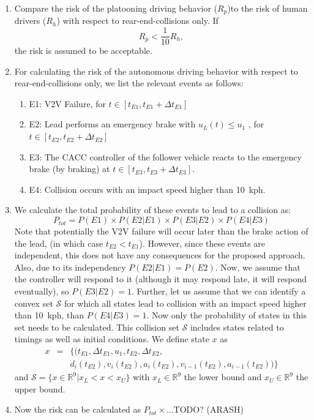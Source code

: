 \documentclass[letterpaper, 10 pt, conference]{ieeeconf}  %
\begin{document}
\begin{enumerate}
\item{Compare the risk of the platooning driving behavior ($R_p$)to the risk of human drivers ($R_h$) with respect to rear-end-collisions only. If $$R_p < \frac{1}{10} R_h, $$ the risk is assumed to be acceptable.}
\item{For calculating the risk of the autonomous driving behavior with respect to rear-end-collisions only, we list the relevant events as follows:
\begin{enumerate}
\item{E1: V2V Failure, for $t\in[t_{E1}, t_{E1}+\Delta t_{E1}]$}
\item{E2: Lead performs an emergency brake with $u_{L}(t)\leq u_1$ , for $t\in[t_{E2}, t_{E2}+\Delta t_{E2}]$}
\item{E3: The CACC controller of the follower vehicle reacts to the emergency brake (by braking) at $t\in[t_{E3}, t_{E3}+\Delta t_{E3}]$.}
\item{E4: Collision occurs with an impact speed higher than 10~kph.}
\end{enumerate}
}
\item{We calculate the total probability of these events to lead to a collision as:
\begin{equation}
P_{tot} = P(E1) \times P(E2|E1) \times P(E3|E2) \times P(E4|E3)
\end{equation}
Note that potentially the V2V failure will occur later than the brake action of the lead, (in which case $t_{E2}<t_{E1}$). However, since these events are independent, this does not have any consequences for the proposed approach. Also, due to its independency $ P(E2|E1)=P(E2)$.
Now, we assume that the controller will respond to it (although it may respond late, it will respond eventually), so $P(E3|E2)=1$. Further, let us assume that we can identify a convex set $\mathcal{S}$ for which all states lead to collision with an impact speed higher than 10~kph, than $P(E4|E3)=1$.  Now only the probability of states in this set needs to be calculated.
This collision set $\mathcal{S}$ includes states related to timings as well as initial conditions. We define state $x$ as
\begin{eqnarray*}
x&=&\{(t_{E1},\Delta t_{E1},u_{1},t_{E2},\Delta t_{E2},\\
&&d_i(t_{E2}),v_i(t_{E2}),a_i(t_{E2}), v_{i-1}(t_{E2}),a_{i-1}(t_{E2})) \}
\end{eqnarray*}
and $\mathcal{S} = \{x \in \mathbb{R}^9|x_L < x < x_U\}$ with $x_L \in \mathbb{R}^9$ the lower bound and $x_U \in \mathbb{R}^9$ the upper bound. }
\item{Now the risk can be calculated as $P_{tot} \times $...TODO? (ARASH)}
\end{enumerate}
\end{document}
